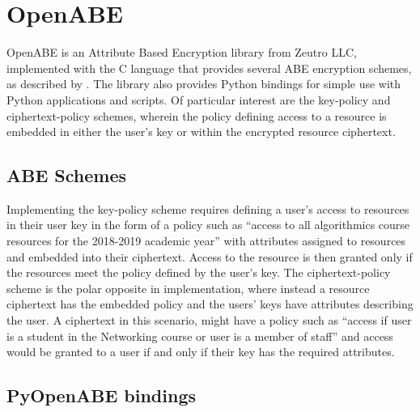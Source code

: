\section{OpenABE}
\label{sec:bkgr_openabe}

OpenABE is an Attribute Based Encryption library from Zeutro LLC, implemented with the C language that provides several ABE encryption schemes, as described by \citet{Akinyele2011}. The library also provides Python bindings for simple use with Python applications and scripts. Of particular interest are the key-policy and ciphertext-policy schemes, wherein the policy defining access to a resource is embedded in either the user's key or within the encrypted resource ciphertext.

\subsection{ABE Schemes}
\label{subsec:bkgr_openabe_schemes}

Implementing the key-policy scheme requires defining a user's access to resources in their user key in the form of a policy such as ``access to all algorithmics course resources for the 2018-2019 academic year'' with attributes assigned to resources and embedded into their ciphertext. Access to the resource is then granted only if the resources meet the policy defined by the user's key. The ciphertext-policy scheme is the polar opposite in implementation, where instead a resource ciphertext has the embedded policy and the users' keys have attributes describing the user. A ciphertext in this scenario, might have a policy such as ``access if user is a student in the Networking course or user is a member of staff'' and access would be granted to a user if and only if their key has the required attributes.

\subsection{PyOpenABE bindings}
\label{subsec:bkgr_pyopenabe}

